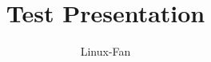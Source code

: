 \documentclass[12pt]{beamer} %
\begin{document}
\title{Test Presentation}
\author{Linux-Fan}

 
 

\end{document}
